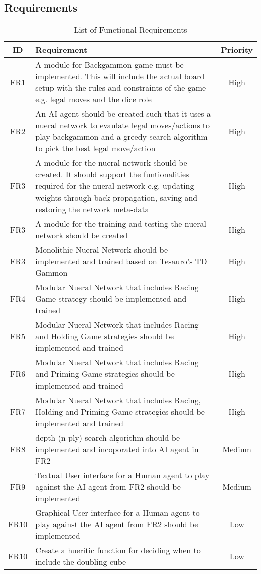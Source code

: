 \documentclass[12pt,a4paper]{article}
\begin{document}
\subsection{Requirements}
\begin{table}[htb]
    \centering
    \caption{List of Functional Requirements}
    \vspace*{6pt}
    \label{req}
    \begin{tabular}{cp{12cm}c}
        \hline
        \hline
        ID & Requirement & Priority \\ 
        \hline
        FR1 & A module for Backgammon game must be implemented. This will include the actual board setup with the rules and constraints of the game e.g. legal moves and the dice role & High \\
        \hline
        FR2 & An AI agent should be created such that it uses a nueral network to evaulate legal moves/actions to play backgammon and a greedy search algorithm to pick the best legal move/action & High \\
        \hline
        FR3 & A module for the nueral network should be created. It should support the funtionalities required for the nueral network e.g. updating weights through back-propagation, saving and restoring the network meta-data & High \\
        \hline
        FR3 & A module for the training and testing the nueral network should be created & High \\
        \hline
        FR3 & Monolithic Nueral Network should be implemented and trained based on Tesauro's TD Gammon & High \\
        \hline
        FR4 & Modular Nueral Network that includes Racing Game strategy should be implemented and trained & High \\
        \hline
        FR5 & Modular Nueral Network that includes Racing and Holding Game strategies should be implemented and trained & High \\
        \hline
        FR6 & Modular Nueral Network that includes Racing and Priming Game strategies should be implemented and trained & High \\
        \hline
        FR7 & Modular Nueral Network that includes Racing, Holding and Priming Game strategies should be implemented and trained & High \\
        \hline
        FR8 & depth (n-ply) search algorithm should be implemented and incoporated into AI agent in FR2 & Medium \\
        \hline
        FR9 & Textual User interface for a Human agent to play against the AI agent from FR2 should be implemented & Medium \\
        \hline
        FR10 & Graphical User interface for a Human agent to play against the AI agent from FR2 should be implemented & Low \\
        \hline
        FR10 & Create a hueritic function for deciding when to include the doubling cube & Low \\
        \hline
        
    \end{tabular}
\end{table}
\end{document}
